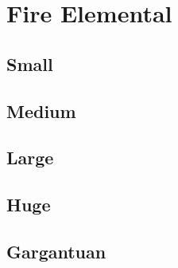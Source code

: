 \section{Fire Elemental}

\subsection{Small}

\subsection{Medium}

\subsection{Large}

\subsection{Huge}

\subsection{Gargantuan}